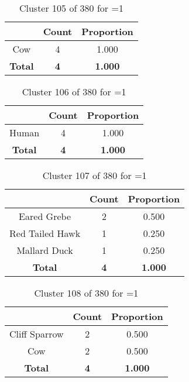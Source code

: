 \begin{table}[ht!]
\centering
\begin{tabular}{|c|c|c|}
\hline
\bf \Spec{} &\bf Count &\bf Proportion\\ \hline \hline
Cow & 4 & 1.000\\ \hline
\hline
\bf Total & \bf 4 & \bf 1.000\\ \hline
\end{tabular}
\label{tab:cluster:105:1}
\caption{Cluster 105 of 380 for \minneigh{}=1}
\end{table}

\begin{table}[ht!]
\centering
\begin{tabular}{|c|c|c|}
\hline
\bf \Spec{} &\bf Count &\bf Proportion\\ \hline \hline
Human & 4 & 1.000\\ \hline
\hline
\bf Total & \bf 4 & \bf 1.000\\ \hline
\end{tabular}
\label{tab:cluster:106:1}
\caption{Cluster 106 of 380 for \minneigh{}=1}
\end{table}

\begin{table}[ht!]
\centering
\begin{tabular}{|c|c|c|}
\hline
\bf \Spec{} &\bf Count &\bf Proportion\\ \hline \hline
Eared Grebe & 2 & 0.500\\ \hline
Red Tailed Hawk & 1 & 0.250\\ \hline
Mallard Duck & 1 & 0.250\\ \hline
\hline
\bf Total & \bf 4 & \bf 1.000\\ \hline
\end{tabular}
\label{tab:cluster:107:1}
\caption{Cluster 107 of 380 for \minneigh{}=1}
\end{table}

\begin{table}[ht!]
\centering
\begin{tabular}{|c|c|c|}
\hline
\bf \Spec{} &\bf Count &\bf Proportion\\ \hline \hline
Cliff Sparrow & 2 & 0.500\\ \hline
Cow & 2 & 0.500\\ \hline
\hline
\bf Total & \bf 4 & \bf 1.000\\ \hline
\end{tabular}
\label{tab:cluster:108:1}
\caption{Cluster 108 of 380 for \minneigh{}=1}
\end{table}

